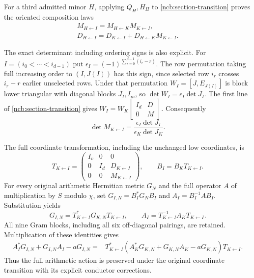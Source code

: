 For a third admitted minor $H$, applying $Q_H,H_H$ to
\eqref{ncb:section-transition} proves the oriented composition laws
\begin{equation}\tag{NCB19}\label{ncb:cocycle}
\begin{gathered}
M_{H\leftarrow I}=M_{H\leftarrow K}M_{K\leftarrow I},\\
D_{H\leftarrow I}
 =D_{K\leftarrow I}+D_{H\leftarrow K}M_{K\leftarrow I}.
\end{gathered}
\end{equation}

The exact determinant including ordering signs is also explicit.
For $I=(i_0<\cdots<i_{d-1})$ put
$\epsilon_I=(-1)^{\sum_{r=0}^{d-1}(i_r-r)}$.
The row permutation taking full increasing order to $(I,J(I))$
has this sign, since selected row $i_r$ crosses $i_r-r$ earlier
unselected rows. Under that permutation $W_I=[J,E_{J(I)}]$ is
block lower triangular with diagonal blocks $J_I,I_m$, so
$\det W_I=\epsilon_I\det J_I$. The first line of
\eqref{ncb:section-transition} gives
$W_I=W_K\left[\begin{smallmatrix}I_d&D\\0&M\end{smallmatrix}\right]$.
Consequently
\begin{equation}\tag{NCB20}\label{ncb:dettransition}
\det M_{K\leftarrow I}
 =\frac{\epsilon_I\det J_I}{\epsilon_K\det J_K}.
\end{equation}

The full coordinate transformation, including the unchanged low
coordinates, is
\begin{equation}\tag{NCB21}\label{ncb:full-transition}
T_{K\leftarrow I}=
\begin{pmatrix}I_v&0&0\\0&I_d&D_{K\leftarrow I}\\
0&0&M_{K\leftarrow I}\end{pmatrix},
\qquad B_I=B_KT_{K\leftarrow I}.
\end{equation}
For every original arithmetic Hermitian metric $G_N$ and the full
operator $A$ of multiplication by $S$ modulo $\chi$, set
$G_{I,N}=B_I^*G_NB_I$ and $A_I=B_I^{-1}AB_I$. Substitution yields
\begin{equation}\tag{NCB22}\label{ncb:gram-action}
G_{I,N}=T_{K\leftarrow I}^*G_{K,N}T_{K\leftarrow I},\qquad
A_I=T_{K\leftarrow I}^{-1}A_KT_{K\leftarrow I}.
\end{equation}
All nine Gram blocks, including all six off-diagonal pairings, are
retained. Multiplication of these identities gives
\begin{equation}\tag{NCB23}\label{ncb:centered-action}
\begin{split}
A_I^*G_{I,N}+G_{I,N}A_I-aG_{I,N}
={}&T_{K\leftarrow I}^*
(A_K^*G_{K,N}+G_{K,N}A_K-aG_{K,N})T_{K\leftarrow I}.
\end{split}
\end{equation}
Thus the full arithmetic action is preserved under the original
coordinate transition with its explicit conductor corrections.

